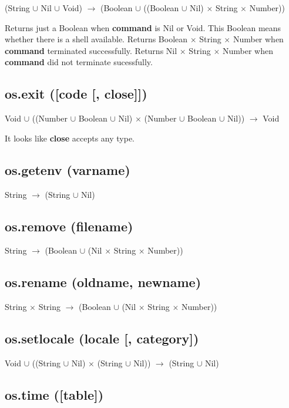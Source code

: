 \documentclass[12pt]{article}
\begin{document}
(String $\cup$ Nil $\cup$ Void) $\rightarrow$
(Boolean $\cup$ ((Boolean $\cup$ Nil) $\times$ String $\times$ Number))

Returns just a Boolean when \textbf{command} is Nil or Void.
This Boolean means whether there is a shell available.
Returns Boolean $\times$ String $\times$ Number when \textbf{command}
terminated successfully.
Returns Nil $\times$ String $\times$ Number when \textbf{command}
did not terminate sucessfully.

\subsection{os.exit ([code [, close]])}

Void $\cup$
((Number $\cup$ Boolean $\cup$ Nil) $\times$
(Number $\cup$ Boolean $\cup$ Nil)) $\rightarrow$
Void

It looks like \textbf{close} accepts any type.

\subsection{os.getenv (varname)}

String $\rightarrow$ (String $\cup$ Nil)

\subsection{os.remove (filename)}

String $\rightarrow$
(Boolean $\cup$ (Nil $\times$ String $\times$ Number))

\subsection{os.rename (oldname, newname)}

String $\times$ String $\rightarrow$
(Boolean $\cup$ (Nil $\times$ String $\times$ Number))

\subsection{os.setlocale (locale [, category])}

Void $\cup$
((String $\cup$ Nil) $\times$
(String $\cup$ Nil)) $\rightarrow$
(String $\cup$ Nil)

\subsection{os.time ([table])}
\end{document}
